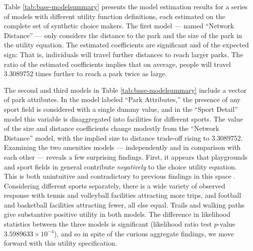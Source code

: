 \documentclass[]{elsarticle} %
\begin{document}
Table \ref{tab:base-modelsummary} presents the model estimation results for a
series of models with different utility function definitions, each estimated on the
complete set of synthetic choice makers. The first model --- named ``Network
Distance'' --- only considers the distance to the park and the size of the park
in the utility equation. The estimated coefficients are significant and of the
expected sign: That is, individuals will travel further distances to reach larger
parks. The ratio of the estimated coefficients implies that on average, people
will travel 3.3089752 times further to reach a park twice as large.

The second and third models in Table \ref{tab:base-modelsummary} include a
vector of park attributes. In the model labeled ``Park Attributes,'' the presence
of any sport field is considered with a single dummy value, and in the ``Sport
Detail'' model this variable is disaggregated into facilities for different
sports. The value of the size and distance coefficients change modestly from
the ``Network Distance'' model, with the implied size to distance trade-off rising
to 3.3089752. Examining the two amenities models --- independently and in
comparison with each other --- reveals a few surprising findings. First, it
appears that playgrounds and sport fields in general contribute \emph{negatively} to
the choice utility equation. This is both unintuitive and contradictory to
previous findings in this space \citep[e.g.,][]{Kinnell2006}. Considering different
sports separately, there is a wide variety of observed response with tennis and
volleyball facilities attracting more trips, and football and basketball
facilities attracting fewer, all else equal. Trails and walking paths give
substantive positive utility in both models. The difference in likelihood statistics
between the three models is significant (likelihood ratio test
\(p\)-value \ensuremath{3.5989633\times 10^{-4}}), and so in spite of the curious aggregate findings,
we move forward with this utility specification.
\end{document}
